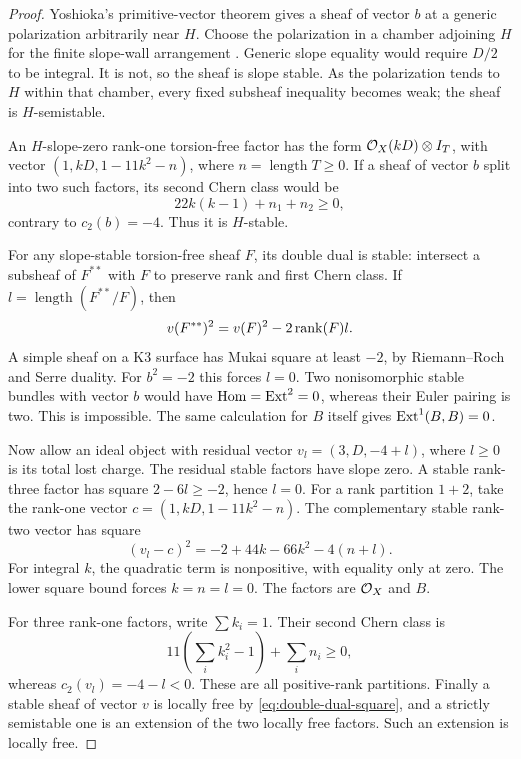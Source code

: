\begin{proof}
Yoshioka's primitive-vector theorem
\cite[Theorem~0.1 and condition $(\natural)$]{yoshioka99}
gives a sheaf of vector $b$ at a generic polarization arbitrarily
near $H$. Choose the polarization in a chamber adjoining $H$ for
the finite slope-wall arrangement
\cite[Theorem~6.6]{grebtoma}. Generic slope equality would require
$D/2$ to be integral. It is not, so the sheaf is slope stable.
As the polarization tends to $H$ within that chamber, every fixed
subsheaf inequality becomes weak; the sheaf is $H$-semistable.

An $H$-slope-zero rank-one torsion-free factor has the form
$\mathcal O_X(kD)\otimes I_T$, with vector
$(1,kD,1-11k^2-n)$, where $n=\operatorname{length}T\ge0$.
If a sheaf of vector $b$ split into two such factors, its second
Chern class would be
\[
 22k(k-1)+n_1+n_2\ge0,
\]
contrary to $c_2(b)=-4$. Thus it is $H$-stable.

For any slope-stable torsion-free sheaf $F$, its double dual is
stable: intersect a subsheaf of $F^{**}$ with $F$ to preserve
rank and first Chern class. If $l=\operatorname{length}(F^{**}/F)$,
then
\begin{equation}\label{eq:double-dual-square}
 v(F^{**})^2=v(F)^2-2\operatorname{rank}(F)l.
\end{equation}
A simple sheaf on a K3 surface has Mukai square at least $-2$,
by Riemann--Roch and Serre duality. For $b^2=-2$ this forces
$l=0$. Two nonisomorphic stable bundles with vector $b$ would
have $\operatorname{Hom}=\operatorname{Ext}^2=0$, whereas their Euler pairing is two. This
is impossible. The same calculation for $B$ itself gives
$\operatorname{Ext}^1(B,B)=0$.

Now allow an ideal object with residual vector
$v_l=(3,D,-4+l)$, where $l\ge0$ is its total lost charge.
The residual stable factors have slope zero. A stable rank-three
factor has square $2-6l\ge-2$, hence $l=0$. For a rank partition
$1+2$, take the rank-one vector
$c=(1,kD,1-11k^2-n)$. The complementary stable rank-two vector
has square
\begin{equation}\label{eq:isolated-rank-two-bound}
 (v_l-c)^2=-2+44k-66k^2-4(n+l).
\end{equation}
For integral $k$, the quadratic term is nonpositive, with equality
only at zero. The lower square bound forces $k=n=l=0$. The
factors are $\mathcal O_X$ and $B$.

For three rank-one factors, write $\sum k_i=1$. Their second
Chern class is
\[
 11\left(\sum_i k_i^2-1\right)+\sum_i n_i\ge0,
\]
whereas $c_2(v_l)=-4-l<0$. These are all positive-rank
partitions. Finally a stable sheaf of vector $v$ is locally free
by \eqref{eq:double-dual-square}, and a strictly semistable one
is an extension of the two locally free factors. Such an
extension is locally free.
\end{proof}

